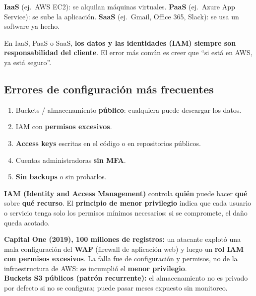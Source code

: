 \documentclass[12pt,a4paper]{article}
\begin{document}
\textbf{IaaS} (ej.\ AWS EC2): se alquilan m\'aquinas virtuales.
\textbf{PaaS} (ej.\ Azure App Service): se sube la aplicaci\'on.
\textbf{SaaS} (ej.\ Gmail, Office 365, Slack): se usa un software ya hecho.

\begin{cajaNota}[title={Lo que nunca cambia}]
En IaaS, PaaS o SaaS, \textbf{los datos y las identidades (IAM) siempre son
responsabilidad del cliente}. El error m\'as com\'un es creer que ``si est\'a en
AWS, ya est\'a seguro''.
\end{cajaNota}

\subsection{Errores de configuraci\'on m\'as frecuentes}
\begin{enumerate}
  \item Buckets / almacenamiento \textbf{p\'ublico}: cualquiera puede descargar los datos.
  \item IAM con \textbf{permisos excesivos}.
  \item \textbf{Access keys} escritas en el c\'odigo o en repositorios p\'ublicos.
  \item Cuentas administradoras \textbf{sin MFA}.
  \item \textbf{Sin backups} o sin probarlos.
\end{enumerate}

\begin{cajaDefinicion}[title={IAM y menor privilegio}]
\textbf{IAM (Identity and Access Management)} controla \textbf{qui\'en} puede hacer
\textbf{qu\'e} sobre \textbf{qu\'e recurso}. El \textbf{principio de menor privilegio}
indica que cada usuario o servicio tenga solo los permisos m\'inimos necesarios:
si se compromete, el da\~no queda acotado.
\end{cajaDefinicion}

\begin{cajaCaso}[title={Casos reales}]
\textbf{Capital One (2019), 100 millones de registros:} un atacante explot\'o una
mala configuraci\'on del \textbf{WAF} (firewall de aplicaci\'on web) y luego un
\textbf{rol IAM con permisos excesivos}. La falla fue de configuraci\'on y permisos,
no de la infraestructura de AWS: se incumpli\'o el \textbf{menor privilegio}.\\[3pt]
\textbf{Buckets S3 p\'ublicos (patr\'on recurrente):} el almacenamiento no es privado
por defecto si no se configura; puede pasar meses expuesto sin monitoreo.
\end{cajaCaso}
\end{document}
